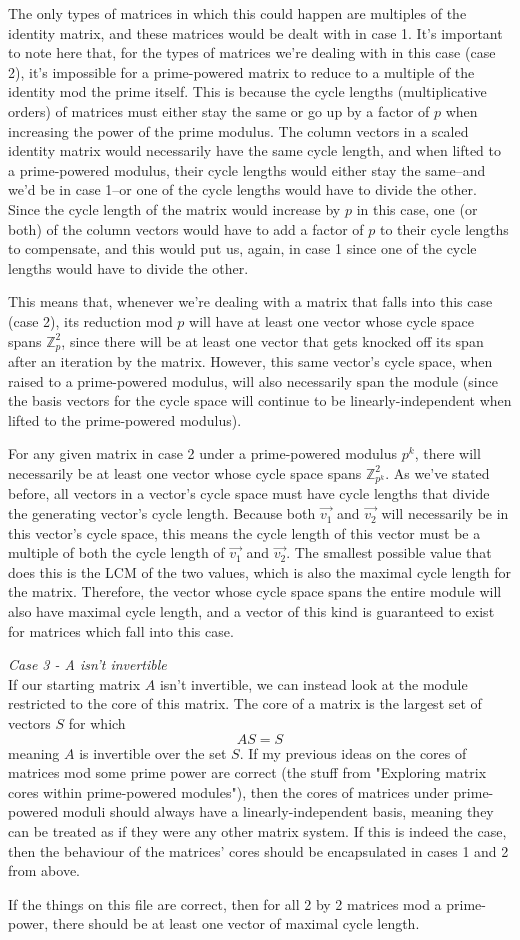 \documentclass[a4paper, 12pt, reqno]{amsart}
\begin{document}
	The only types of matrices in which this could happen are multiples of the identity matrix, and these matrices would be dealt with in case 1. It's important to note here that, 
	for the types of matrices we're dealing with in this case (case 2), it's impossible for a prime-powered matrix to reduce to a multiple of the identity mod the prime itself. This 
	is because the cycle lengths (multiplicative orders) of matrices must either stay the same or go up by a factor of $p$ when increasing the power of the prime modulus. The column 
	vectors in a scaled identity matrix would necessarily have the same cycle length, and when lifted to a prime-powered modulus, their cycle lengths would either stay the same--and 
	we'd be in case 1--or one of the cycle lengths would have to divide the other. Since the cycle length of the matrix would increase by $p$ in this case, one (or both) of the 
	column vectors would have to add a factor of $p$ to their cycle lengths to compensate, and this would put us, again, in case 1 since one of the cycle lengths would have to 
	divide the other.
	
	This means that, whenever we're dealing with a matrix that falls into this case (case 2), its reduction mod $p$ will have at least one vector whose cycle space spans
	$\mathds{Z}_{p}^2$, since there will be at least one vector that gets knocked off its span after an iteration by the matrix. However, this same vector's cycle space, when
	raised to a prime-powered modulus, will also necessarily span the module (since the basis vectors for the cycle space will continue to be linearly-independent when lifted to
	the prime-powered modulus).
	
	For any given matrix in case 2 under a prime-powered modulus $p^k$, there will necessarily be at least one vector whose cycle space spans $\mathds{Z}_{p^k}^2$. As we've stated
	before, all vectors in a vector's cycle space must have cycle lengths that divide the generating vector's cycle length. Because both $\vec{v_1}$ and $\vec{v_2}$ will
	necessarily be in this vector's cycle space, this means the cycle length of this vector must be a multiple of both the cycle length of $\vec{v_1}$ and $\vec{v_2}$. The smallest
	possible value that does this is the LCM of the two values, which is also the maximal cycle length for the matrix. Therefore, the vector whose cycle space spans the entire
	module will also have maximal cycle length, and a vector of this kind is guaranteed to exist for matrices which fall into this case.
	
	\emph{Case 3 - A isn't invertible} \\
	If our starting matrix $A$ isn't invertible, we can instead look at the module restricted to the core of this matrix. The core of a matrix is the largest set of vectors $S$
	for which
	\[
		AS = S
	\]
	meaning $A$ is invertible over the set $S$. If my previous ideas on the cores of matrices mod some prime power are correct (the stuff from "Exploring matrix cores within
	prime-powered modules"), then the cores of matrices under prime-powered moduli should always have a linearly-independent basis, meaning they can be treated as if they were
	any other matrix system. If this is indeed the case, then the behaviour of the matrices' cores should be encapsulated in cases 1 and 2 from above.
	
	If the things on this file are correct, then for all 2 by 2 matrices mod a prime-power, there should be at least one vector of maximal cycle length.
\end{document}
